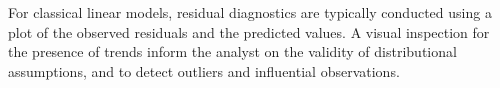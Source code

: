 \documentclass[12pt, a4paper]{report}
\theoremstyle{plain}
\theoremstyle{definition}
\theoremstyle{remark}
\begin{document}
For classical linear models, residual diagnostics are typically conducted using a plot of the observed residuals and the predicted values. A visual inspection for the presence of trends inform the analyst on the validity of distributional assumptions, and to detect outliers and influential observations.

%
%
%
%
%
%
%
%
%
%
%
\end{document}
